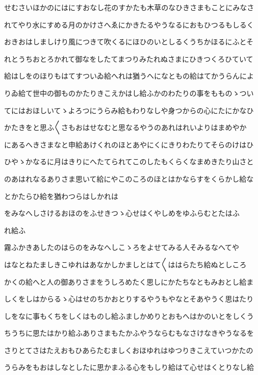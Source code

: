 \documentclass[a4paper,11pt,landscape]{ltjtarticle}
\begin{document}
\par\medskip
せむさいほかのにはにすおなし花のすかたも木草のなひきさまもことにみなさ
\par\medskip
れてやり水にすめる月のかけさへゑにかきたるやうなるにおもひつるもしるく
\par\medskip
おきおはしましけり風につきて吹くるにほひのいとしるくうちかほるにふとそ
\par\medskip
れとうちおとろかれて御なをしたてまつりみたれぬさまにひきつくろひていて
\par\medskip
給はしをのほりもはてすついゐ給へれは猶うへになともの給はてかうらんによ
\par\medskip
りゐ給て世中の御ものかたりきこえかはし給ふかのわたりの事をもものゝつい
\par\medskip
てにはおほしいてゝよろつにうらみ給もわりなしや身つからの心にたにかなひ
\par\medskip
かたきをと思ふ〱さもおはせなむと思なるやうのあれはれいよりはまめやか
\par\medskip
にあるへきさまなと申給あけくれのほとあやにくにきりわたりてそらのけはひ
\par\medskip
ひやゝかなるに月はきりにへたてられてこのしたもくらくなまめきたり山さと
\par\medskip
のあはれなるありさま思いて給にやこのころのほとはかならすをくらかし給な
\par\medskip
とかたらひ給を猶わつらはしかれは
\par\medskip
をみなへしさけるおほのをふせきつゝ心せはくやしめをゆふらむとたはふ
\par\medskip
れ給ふ
\par\medskip
霧ふかきあしたのはらのをみなへしこゝろをよせてみる人そみるなへてや
\par\medskip
はなとねたましきこゆれはあなかしかましとはて〱ははらたち給ぬとしころ
\par\medskip
かくの給へと人の御ありさまをうしろめたく思しにかたちなともみおとし給ま
\par\medskip
しくをしはからるゝ心はせのちかおとりするやうもやなとそあやうく思はたり
\par\medskip
しをなに事もくちをしくはものし給ふましかめりとおもへはかのいとをしくう
\par\medskip
ちうちに思たはかり給ふありさまもたかふやうならむもなさけなきやうなるを
\par\medskip
さりとてさはたえおもひあらたむましくおほゆれはゆつりきこえていつかたの
\par\medskip
うらみをもおはしなとしたに思かまふる心をもしり給はて心せはくとりなし給
\end{document}
